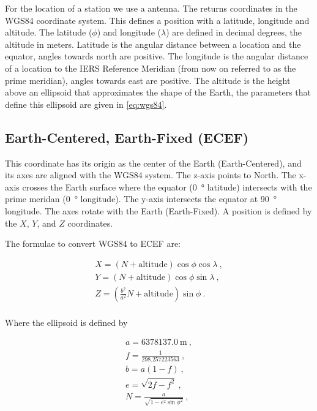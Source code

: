 For the location of a station we use a \gps antenna. The \gps returns
coordinates in the WGS84 coordinate system. This defines a position with
a latitude, longitude and altitude. The latitude ($\phi$) and longitude
($\lambda$) are defined in decimal degrees, the altitude in meters.
Latitude is the angular distance between a location and the equator,
angles towards north are positive. The longitude is the angular distance
of a location to the IERS Reference Meridian (from now on referred to as
the prime meridian), angles towards east are positive. The altitude is
the height above an ellipsoid that approximates the shape of the Earth,
the parameters that define this ellipsoid are given in \eqref{eq:wgs84}.


\subsection{Earth-Centered, Earth-Fixed (ECEF)}

This coordinate has its origin as the center of the Earth
(Earth-Centered), and its axes are aligned with the WGS84 system. The
z-axis points to North. The x-axis crosses the Earth surface where the
equator (\SI{0}{\degree} latitude) intersects with the prime meridan
(\SI{0}{\degree} longitude). The y-axis intersects the equator at
\SI{90}{\degree} longitude. The axes rotate with the Earth
(Earth-Fixed). A position is defined by the $X$, $Y$, and $Z$
coordinates.

The formulae to convert WGS84 to ECEF are:

\begin{equation}
    \begin{array}{l}
        X = \left(N + \mathrm{altitude}\right) \cos{\phi} \cos{\lambda} \ , \\
        Y = \left(N + \mathrm{altitude}\right) \cos{\phi} \sin{\lambda} \ , \\
        Z = \left(\frac{b^2}{a^2} N + \mathrm{altitude}\right) \sin{\phi} \ . \\
    \end{array}
\end{equation}

\noindent
Where the ellipsoid is defined by

\begin{equation}
    \label{eq:wgs84}
    \begin{array}{l}
        a = \SI{6378137.0}{\meter} \ , \\
        f = \frac{1}{298.257223563} \ , \\
        b = a (1 - f) \ , \\
        e = \sqrt{2 f - f^2} \ , \\
        N = \frac{a}{\sqrt{1 - e^2 \sin{\phi}^2}} \ , \\
    \end{array}
\end{equation}

